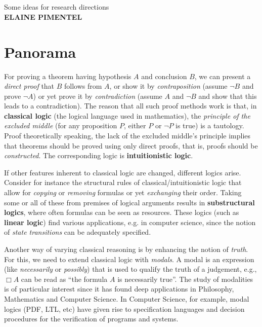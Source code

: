 \documentclass[11pt,a4paper]{article}
\newcommand{\boundarypage}[1]{ %
\begin{center}
\strut\\\vspace{1cm}
\LARGE
\textbf{#1}\\
\vspace{3cm}
Some ideas for research directions\\
\vspace{1cm}
\textbf{ELAINE PIMENTEL}\\
\vspace{3cm}
\vspace{3cm}
\end{center}

}
\begin{document}
\boundarypage{ }

\newpage

\tableofcontents

\newpage


\setcounter{mainpartbegin}{\thepage}
\addtocounter{mainpartbegin}{-1}
%




\section{Panorama}
For proving a theorem having  hypothesis $A$ and conclusion $B$, we can present a {\em direct proof} that $B$ follows from $A$, or show it by {\em contraposition} (assume 
$\neg B$ and prove 
$\neg A$) or yet prove it by {\em contradiction} (assume $A$ and 
$\neg B$ and show that this leads to a contradiction). The reason that all such proof methods work is that, in {\bf classical logic} (the logical language used in mathematics), the {\em principle of the excluded middle} (for any proposition $P$, either $P$ or $\neg P$ is true) is a tautology. 
Proof theoretically speaking, the lack of the excluded middle's principle implies that theorems should be proved using only  direct proofs, that is, proofs should be {\em constructed}. The corresponding logic is {\bf intuitionistic logic}.

If other features inherent to classical logic are changed, different logics arise.  Consider for instance the structural rules of classical/intuitionistic logic that allow for {\em copying} or  {\em removing} formulas or yet {\em exchanging} their order.
Taking some or all of these from premises of logical arguments results in {\bf substructural logics}, where often formulas can be seen as resources. 
These logics (such as {\bf linear logic}) find various applications, e.g. in computer science, 
since the notion of {\em state transitions} can be adequately specified.

Another way of varying classical reasoning is by enhancing the notion of {\em truth}.
For this, we need to extend classical logic with {\em modals}. A modal is an expression (like {\em necessarily} or {\em possibly}) that is used to qualify the truth of a judgement, e.g., $\Box A$ 
can be read as ``the formula $A$ is necessarily true''. The study of modalities is of particular interest since it has found deep applications in Philosophy, Mathematics and Computer Science.
In Computer Science, for example, modal logics (PDF, LTL, etc) have given rise to specification languages and decision procedures for the verification of programs and systems.
\end{document}
